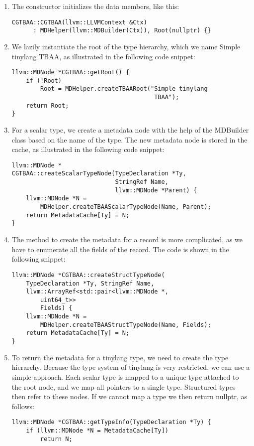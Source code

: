 \begin{enumerate}
\item The constructor initializes the data members, like this:
\begin{lstlisting}[caption={}]
CGTBAA::CGTBAA(llvm::LLVMContext &Ctx)
	  : MDHelper(llvm::MDBuilder(Ctx)), Root(nullptr) {}
\end{lstlisting}

\item We lazily instantiate the root of the type hierarchy, which we name Simple tinylang TBAA, as illustrated in the following code snippet:
\begin{lstlisting}[caption={}]
llvm::MDNode *CGTBAA::getRoot() {
	if (!Root)
		Root = MDHelper.createTBAARoot("Simple tinylang 
										TBAA");
	return Root;
}
\end{lstlisting}

\item For a scalar type, we create a metadata node with the help of the MDBuilder class based on the name of the type. The new metadata node is stored in the cache, as illustrated in the following code snippet:
\begin{lstlisting}[caption={}]
llvm::MDNode *
CGTBAA::createScalarTypeNode(TypeDeclaration *Ty,
							 StringRef Name,
							 llvm::MDNode *Parent) {
	llvm::MDNode *N =
		MDHelper.createTBAAScalarTypeNode(Name, Parent);
	return MetadataCache[Ty] = N;
}
\end{lstlisting}

\item The method to create the metadata for a record is more complicated, as we have to enumerate all the fields of the record. The code is shown in the following snippet:
\begin{lstlisting}[caption={}]
llvm::MDNode *CGTBAA::createStructTypeNode(
	TypeDeclaration *Ty, StringRef Name,
	llvm::ArrayRef<std::pair<llvm::MDNode *, 
		uint64_t>>
		Fields) {
	llvm::MDNode *N =
		MDHelper.createTBAAStructTypeNode(Name, Fields);
	return MetadataCache[Ty] = N;
}
\end{lstlisting}

\item To return the metadata for a tinylang type, we need to create the type hierarchy. Because the type system of tinylang is very restricted, we can use a simple approach. Each scalar type is mapped to a unique type attached to the root node, and we map all pointers to a single type. Structured types then refer to these nodes. If we cannot map a type we then return nullptr, as follows:
\begin{lstlisting}[caption={}]
llvm::MDNode *CGTBAA::getTypeInfo(TypeDeclaration *Ty) {
	if (llvm::MDNode *N = MetadataCache[Ty])
		return N;
	

\end{lstlisting}
\end{enumerate}
